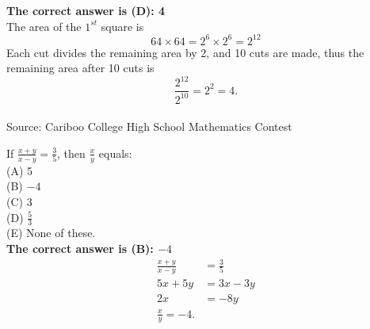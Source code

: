 \documentclass{article}
\begin{document}

\textbf{The correct answer is (D): 4}\\[1 ex]
The area of the $1^{st}$ square is 
\begin{equation*}
64\times64=2^{6}\times2^{6}=2^{12}
\end{equation*}
Each cut divides the remaining area by 2, and 10 cuts are made, thus the remaining area after 10 cuts is
\begin{equation*}
\frac{2^{12}}{2^{10}}=2^{2}=4.
\end{equation*}
\\[5 ex]

\scriptsize
Source: Cariboo College High School Mathematics Contest

\normalsize
If $\frac{x+y}{x-y}=\frac{3}{5}$, then $\frac{x}{y}$ equals:\\
(A) 5\\
(B) $-4$\\
(C) 3\\
(D) $\frac{5}{3}$\\
(E) None of these.\\


\textbf{The correct answer is (B): $-4$}\\[1 ex]
\begin{align*}
\frac{x+y}{x-y}&=\frac{3}{5}\\
5x+5y&=3x-3y\\
2x&=-8y\\
\frac{x}{y}=-4.
\end{align*}
\\[5 ex]
\end{document}
